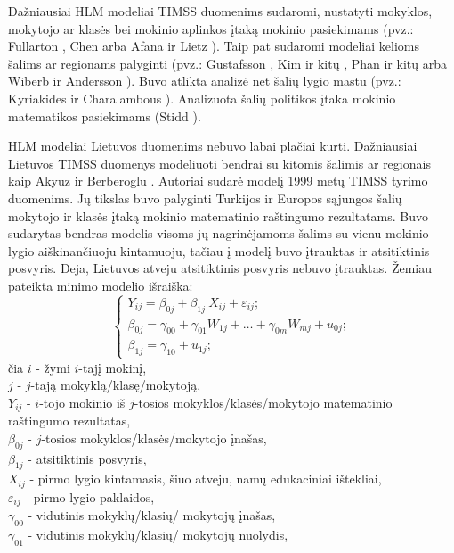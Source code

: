 \documentclass[12pt,a4paper]{article}
\begin{document}
\indent Dažniausiai HLM modeliai TIMSS duomenims sudaromi, nustatyti mokyklos, mokytojo ar klasės bei mokinio aplinkos įtaką mokinio pasiekimams (pvz.: Fullarton \cite{timssSch1}, Chen \cite{timssSchool2} arba Afana ir Lietz \cite{timssCpalyg1}). Taip pat sudaromi modeliai kelioms šalims ar regionams palyginti (pvz.: Gustafsson \cite{timssCpalyg}, Kim ir kitų \cite{timssCpalyg2}, Phan ir kitų \cite{timssCpalyg3} arba Wiberb ir Andersson \cite{timssCpalyg4}). Buvo atlikta analizė net šalių lygio mastu (pvz.: Kyriakides ir Charalambous \cite{countryHLM}). Analizuota šalių politikos įtaka mokinio matematikos pasiekimams (Stidd \cite{timssPol}).

\indent HLM modeliai Lietuvos duomenims nebuvo labai plačiai kurti. Dažniausiai Lietuvos TIMSS duomenys modeliuoti bendrai su kitomis šalimis ar regionais kaip Akyuz ir Berberoglu \cite{2007All}. Autoriai sudarė modelį 1999 metų TIMSS tyrimo duomenims. Jų tikslas buvo palyginti Turkijos ir Europos sąjungos šalių mokytojo ir klasės įtaką mokinio matematinio raštingumo rezultatams. Buvo sudarytas bendras modelis visoms jų nagrinėjamoms šalims su vienu mokinio lygio aiškinančiuoju kintamuoju, tačiau į modelį buvo įtrauktas ir atsitiktinis posvyris. Deja, Lietuvos atveju atsitiktinis posvyris nebuvo įtrauktas. Žemiau pateikta minimo modelio išraiška:
\[ \left\{
\begin{array}{l}
Y_{ij} = \beta_{0j}+\beta_{1j}\ X_{ij}+\varepsilon_{ij}; \\
\beta_{0j} = \gamma_{00} + \gamma_{01} W_{1j}+\dots+\gamma_{0m} W_{mj}+u_{0j};\\
\beta_{1j} = \gamma_{10} + u_{1j};
\end{array} \right.
\]
\small
čia $i$ - žymi $i$-tajį mokinį,\\
$j$ - $j$-tają mokyklą/klasę/mokytoją,\\
$Y_{ij}$ - $i$-tojo mokinio iš $j$-tosios mokyklos/klasės/mokytojo matematinio raštingumo rezultatas,\\
$\beta_{0j}$ - $j$-tosios mokyklos/klasės/mokytojo įnašas,\\
$\beta_{1j}$ - atsitiktinis posvyris,\\
$X_{ij}$ - pirmo lygio kintamasis, šiuo atveju, namų edukaciniai ištekliai, \\
$\varepsilon_{ij}$ - pirmo lygio paklaidos,\\
$\gamma_{00}$ - vidutinis mokyklų/klasių/ mokytojų įnašas,\\
$\gamma_{01}$ - vidutinis mokyklų/klasių/ mokytojų nuolydis,\\
\end{document}
